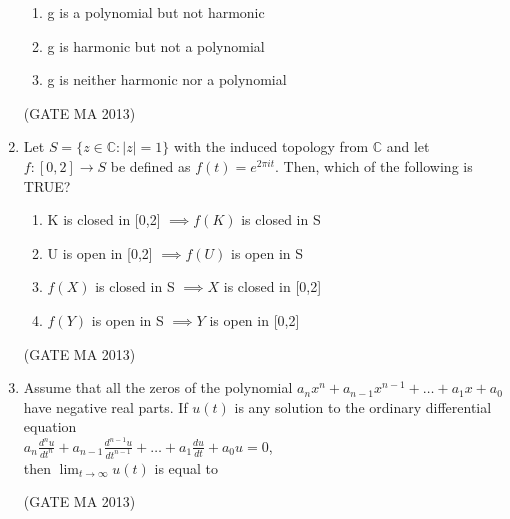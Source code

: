 \documentclass[journal,12pt,onecolumn]{IEEEtran}
\theoremstyle{remark}
\begin{document}
\begin{enumerate}
\begin{enumerate}
        \item g is a polynomial but not harmonic
        \item g is harmonic but not a polynomial
        \item g is neither harmonic nor a polynomial
    \end{enumerate}
    \hfill (GATE MA 2013)
    \item Let $S = \{z \in \mathbb{C} : |z|=1\}$ with the induced topology from $\mathbb{C}$ and let $f: [0,2] \rightarrow S$ be defined as $f(t) = e^{2\pi i t}$. Then, which of the following is TRUE?
    \begin{enumerate}
        \item K is closed in [0,2] $\implies f(K)$ is closed in S
        \item U is open in [0,2] $\implies f(U)$ is open in S
        \item $f(X)$ is closed in S $\implies X$ is closed in [0,2]
        \item $f(Y)$ is open in S $\implies Y$ is open in [0,2]
    \end{enumerate}
    \hfill (GATE MA 2013)
    \item Assume that all the zeros of the polynomial $a_n x^n + a_{n-1}x^{n-1} + \dots + a_1 x + a_0$ have negative real parts. If $u(t)$ is any solution to the ordinary differential equation \\
    $a_n \frac{d^n u}{dt^n} + a_{n-1} \frac{d^{n-1} u}{dt^{n-1}} + \dots + a_1 \frac{du}{dt} + a_0 u = 0$, \\
    then $\lim_{t \to \infty} u(t)$ is equal to
    \begin{enumerate}
    \end{enumerate}
    \hfill (GATE MA 2013)
    
\end{enumerate}
\end{document}
